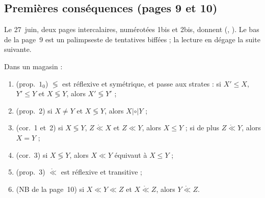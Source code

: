 \subsection*{Premières conséquences (pages 9 et 10)}

Le 27~juin, deux pages intercalaires, numérotées 1bis et 2bis, donnent  (, ). Le bas de la page~9 est un palimpseste de tentatives biffées ; la lecture en dégage la suite suivante.

\begin{encadre}
\begin{theoreme}
Dans un magasin :
\begin{enumerate}
\item[a)] (prop.~$1_0$) $\lessgtr$ est réflexive et symétrique, et passe aux strates : si $X' \leq X$, $Y' \leq Y$ et $X \lessgtr Y$, alors $X' \lessgtr Y'$ ;
\item[b)] (prop.~2) si $X \neq Y$ et $X \lessgtr Y$, alors $X \mathrel{|\circ|} Y$ ;
\item[c)] (cor.~1 et~2) si $X \lessgtr Y$, $Z \mathrel{\mathring\ll} X$ et $Z \ll Y$, alors $X \leq Y$ ; si de plus $Z \mathrel{\mathring\ll} Y$, alors $X = Y$ ;
\item[d)] (cor.~3) si $X \lessgtr Y$, alors $X \ll Y$ équivaut à $X \leq Y$ ;
\item[e)] (prop.~3) $\mathring\ll$ est réflexive et transitive ;
\item[f)] (NB de la page~10) si $X \ll Y \ll Z$ et $X \mathrel{\mathring\ll} Z$, alors $Y \mathrel{\mathring\ll} Z$.
\end{enumerate}
\end{theoreme}
\end{encadre}

